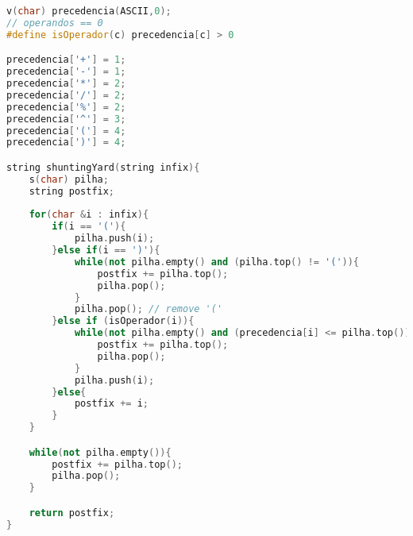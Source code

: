
\begin{lstlisting}[language=C++]
v(char) precedencia(ASCII,0);
// operandos == 0
#define isOperador(c) precedencia[c] > 0

precedencia['+'] = 1;
precedencia['-'] = 1;
precedencia['*'] = 2;
precedencia['/'] = 2;
precedencia['%'] = 2;
precedencia['^'] = 3;
precedencia['('] = 4;
precedencia[')'] = 4;

string shuntingYard(string infix){
	s(char) pilha;
	string postfix;
	
	for(char &i : infix){
		if(i == '('){
			pilha.push(i);
		}else if(i == ')'){
			while(not pilha.empty() and (pilha.top() != '(')){
				postfix += pilha.top();
				pilha.pop();
			}
			pilha.pop(); // remove '('
		}else if (isOperador(i)){
			while(not pilha.empty() and (precedencia[i] <= pilha.top())){
				postfix += pilha.top();
				pilha.pop();
			}
			pilha.push(i);
		}else{
			postfix += i;
		}
	}

	while(not pilha.empty()){
		postfix += pilha.top();
		pilha.pop();
	}

	return postfix;
}

\end{lstlisting}